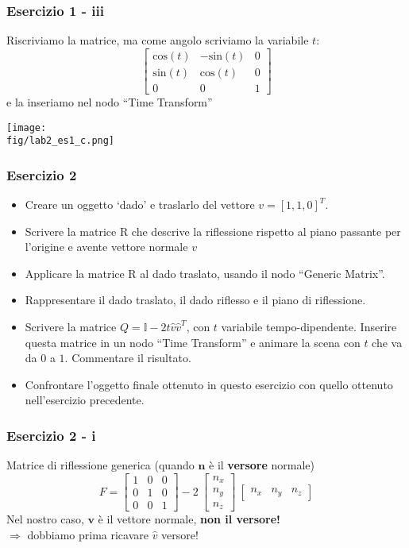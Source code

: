 \documentclass{beamer}
\newcommand{\fig}{figures} %
\begin{document}
\begin{frame}
\frametitle{Esercizio 1 - iii}
Riscriviamo la matrice, ma come angolo scriviamo la variabile $t$:
\begin{equation*}
\begin{bmatrix}
\mbox{cos}(t) & - \mbox{sin}(t) & 0\\
\mbox{sin}(t) & \mbox{cos}(t)   & 0\\ 
0 & 0 & 1 
\end{bmatrix}
\end{equation*}
e la inseriamo nel nodo ``Time Transform''

    \vspace{0.2cm}
\centering
\texttt{[image: \\fig/lab2\_es1\_c.png]}
\end{frame}

\begin{frame}
\frametitle {Esercizio 2}
\begin{itemize}
    \item Creare un oggetto `dado' e traslarlo del vettore $v = [1, 1, 0]^T$.
    \item Scrivere la matrice R che descrive la riflessione rispetto al piano passante per l'origine e avente vettore normale $v$
    \item Applicare la matrice R al dado traslato, usando il nodo
        ``Generic Matrix''.
    \item Rappresentare il dado traslato, il dado riflesso e il piano di riflessione.
    \item Scrivere la matrice $Q = \mathbb{I} - 2t\hat{v}\hat{v}^T$, con $t$ variabile tempo-dipendente. Inserire questa matrice in un nodo
        ``Time Transform'' e animare la scena con $t$ che va da $0$ a $1$. Commentare il risultato.
    \item Confrontare l'oggetto finale ottenuto in questo esercizio con quello ottenuto nell'esercizio precedente.
\end{itemize}
\end{frame}
\begin{frame}
\frametitle{ Esercizio 2 - i}
    Matrice di riflessione generica (quando $\mathbf{n}$ \`e il \textbf{versore} normale)
\begin{equation}
F = \begin{bmatrix}
      1 & 0 & 0\\
      0 & 1 & 0\\
      0 & 0 & 1
    \end{bmatrix}
    -2~\begin{bmatrix}
    n_x \\
    n_y \\
    n_z
    \end{bmatrix} 
    ~\begin{bmatrix}
    n_x & n_y & n_z
    \end{bmatrix}
\end{equation}
    Nel nostro caso, $\mathbf{v}$ \`e il vettore normale, \textbf{non il versore!} \\
    $\Rightarrow$ dobbiamo prima ricavare $\hat{v}$ versore!
\end{frame}
\end{document}
